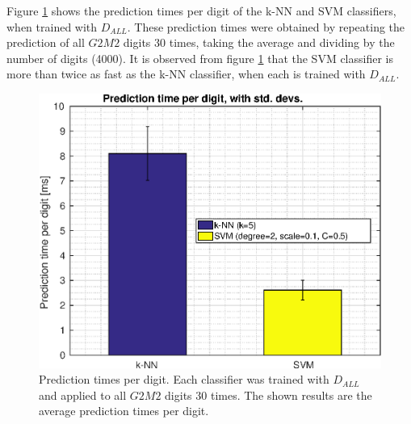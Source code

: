 Figure \ref{fig:prediction-times} shows the prediction times per digit
of the k-NN and SVM classifiers, when trained with \(D_{ALL}\).
These prediction times were obtained by repeating the prediction
of all \(G2M2\) digits 30 times, taking the average and dividing by the number
of digits (4000).
It is observed from figure \ref{fig:prediction-times} that
the SVM classifier is more than twice as fast as the k-NN classifier,
when each is trained with \(D_{ALL}\).
\begin{figure}[ht]
\centering
\includegraphics[width=\figscale]{img/prediction-times}
\caption[Prediction times per digit]
{
Prediction times per digit. Each classifier was trained with \(D_{ALL}\)
and applied to all \(G2M2\) digits 30 times.
The shown results are the average prediction times per digit.
}
\label{fig:prediction-times}
\end{figure}
